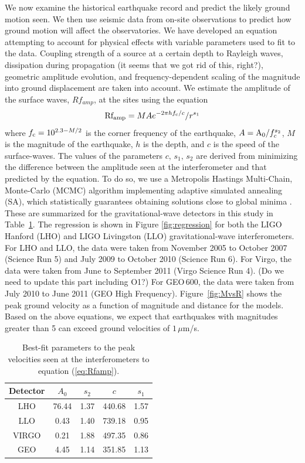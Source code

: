 \documentclass[reprint, prl, aps, showpacs]{revtex4-1}
\newcommand{\rednote}[1]{{\color{red} (#1)}}
\begin{document}
We now examine the historical earthquake record and predict the likely ground motion seen. We then use seismic data from on-site observations to predict how ground motion will affect the observatories. We have developed an equation attempting to account for physical effects with variable parameters used to fit to the data. Coupling strength of a source at a certain depth to Rayleigh waves, dissipation during propagation \rednote{it seems that we got rid of this, right?}, geometric amplitude evolution, and frequency-dependent scaling of the magnitude into ground displacement are taken into account. We estimate the amplitude of the surface waves, $Rf_{amp}$, at the sites using the equation
\begin{equation}
{\rm Rf_{amp}} = M A e^{-2 \pi h f_{\rm c}/c}/r^{s_1}
\label{eq:Rfamp} 
\end{equation}
where $f_{\rm c} = 10^{2.3-M/2}$ is the corner frequency of the earthquake, $A = {\rm A_0}/f_c^{s_2}$, $M$ is the magnitude of the earthquake, $h$ is the depth, and $c$ is the speed of the surface-waves.
The values of the parameters $c,\,s_1,\,s_2$ are derived from minimizing the difference between the amplitude seen at the interferometer and that predicted by the equation. 
To do so, we use a Metropolis Hastings Multi-Chain, Monte-Carlo (MCMC) algorithm implementing adaptive simulated annealing (SA), which statistically guarantees obtaining solutions close to global minima \cite{KiGe1983,In2000}. These are summarized for the gravitational-wave detectors in this study in Table~\ref{table:fit}. The regression is shown in Figure \ref{fig:regression} for both the LIGO Hanford (LHO) and LIGO Livingston (LLO) gravitational-wave interferometers. For LHO and LLO, the data were taken from November 2005 to October 2007 (Science Run 5) and July 2009 to October 2010 (Science Run 6).
For Virgo, the data were taken from June to September 2011 (Virgo Science Run 4). \rednote{Do we need to update this part including O1?} For GEO\,600, the data were taken from July 2010 to June 2011 (GEO High Frequency). Figure~\ref{fig:MvsR} shows the peak ground velocity as a function of magnitude and distance for the models. Based on the above equations, we expect that earthquakes with magnitudes greater than 5 can exceed ground velocities of $1\,\mu$m/s.


\begin{table}[]
\centering
\label{table:fit}
\begin{tabular}{|c|c|c|c|c|}
\hline
Detector & $A_0$ & $s_2$ & $c$ & $s_1$ \\ \hline
LHO & 76.44 & 1.37 & 440.68 & 1.57 \\ \hline
LLO & 0.43 & 1.40 & 739.18 & 0.95 \\ \hline
VIRGO & 0.21 & 1.88 & 497.35 & 0.86 \\ \hline
GEO & 4.45 & 1.14 & 351.85 & 1.13 \\ \hline
\end{tabular}
\caption{Best-fit parameters to the peak velocities seen at the interferometers to equation (\ref{eq:Rfamp}).}
\label{table:fit}
\end{table}
\end{document}
